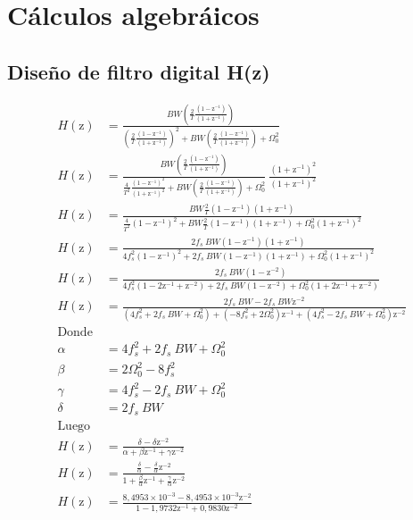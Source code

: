 \chapter{Cálculos algebráicos}
\section{Diseño de filtro digital H(z)}

\begin{equation}
  \begin{split}
    H(\textrm{z}) & = \frac{BW \left(\frac{2}{T}\frac{(1-\textrm{z}^{-1})}{(1+\textrm{z}^{-1})}\right)}{\left(\frac{2}{T}\frac{(1-\textrm{z}^{-1})}{(1+\textrm{z}^{-1})}\right)^2 + BW \left(\frac{2}{T}\frac{(1-\textrm{z}^{-1})}{(1+\textrm{z}^{-1})}\right) + \Omega_0^2} \\
    H(\textrm{z}) & = \frac{BW \left(\frac{2}{T}\frac{(1-\textrm{z}^{-1})}{(1+\textrm{z}^{-1})}\right)}{\frac{4}{T^2}\frac{(1-\textrm{z}^{-1})^2}{(1+\textrm{z}^{-1})^2} + BW \left(\frac{2}{T}\frac{(1-\textrm{z}^{-1})}{(1+\textrm{z}^{-1})}\right) + \Omega_0^2}\ \frac{(1+\textrm{z}^{-1})^2}{(1+\textrm{z}^{-1})^2} \\
    H(\textrm{z}) & = \frac{BW \frac{2}{T} (1-\textrm{z}^{-1}) (1+\textrm{z}^{-1})}{\frac{4}{T^2} (1-\textrm{z}^{-1})^2+ BW \frac{2}{T} (1-\textrm{z}^{-1}) (1+\textrm{z}^{-1}) + \Omega_0^2 (1+\textrm{z}^{-1})^2} \\
    H(\textrm{z}) & = \frac{2 f_s \ BW  (1-\textrm{z}^{-1}) (1+\textrm{z}^{-1})}{4f_s^2 (1-\textrm{z}^{-1})^2+ 2f_s\ BW (1-\textrm{z}^{-1}) (1+\textrm{z}^{-1}) + \Omega_0^2 (1+\textrm{z}^{-1})^2} \\
    H(\textrm{z}) & = \frac{2 f_s \ BW  (1-\textrm{z}^{-2})}{4f_s^2 (1-2\textrm{z}^{-1}+\textrm{z}^{-2})+ 2f_s\ BW (1-\textrm{z}^{-2}) + \Omega_0^2 (1+2\textrm{z}^{-1}+\textrm{z}^{-2})} \\
    H(\textrm{z}) & = \frac{2 f_s \ BW - 2 f_s \ BW\textrm{z}^{-2}}{\left( 4f_s^2 + 2f_s\ BW + \Omega_0^2 \right) + \left(-8f_s^2 + 2\Omega_0^2\right)\textrm{z}^{-1} + \left( 4f_s^2 - 2f_s\ BW + \Omega_0^2 \right)\textrm{z}^{-2}} \\
    \text{Donde} & \\
    \alpha & = 4f_s^2 + 2f_s\ BW + \Omega_0^2 \\
    \beta & = 2\Omega_0^2 - 8f_s^2 \\
    \gamma & = 4f_s^2 - 2f_s\ BW + \Omega_0^2 \\
    \delta & = 2 f_s \ BW \\
    \text{Luego} & \\
    H(\textrm{z}) & = \frac{\delta - \delta \textrm{z}^{-2}}{\alpha + \beta\textrm{z}^{-1} + \gamma\textrm{z}^{-2}} \\
    H(\textrm{z}) & = \frac{\frac{\delta}{\alpha} - \frac{\delta}{\alpha} \textrm{z}^{-2}}{1 + \frac{\beta}{\alpha} \textrm{z}^{-1} + \frac{\gamma}{\alpha} \textrm{z}^{-2}} \\
    H(\textrm{z}) & = \frac{8,4953\times 10^{-3} - 8,4953\times 10^{-3} \textrm{z}^{-2}}{1 - 1,9732 \textrm{z}^{-1} + 0,9830 \textrm{z}^{-2}} \\
  \end{split}
  \label{eq:apendix_filtro_digital}
\end{equation}
